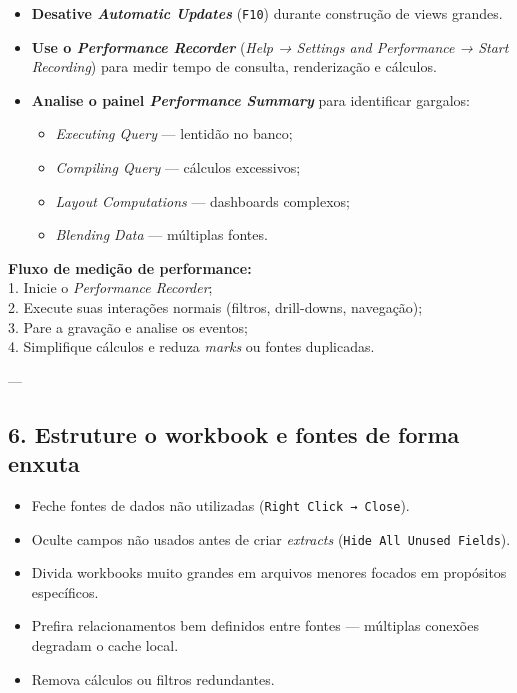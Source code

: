 \begin{itemize}[leftmargin=*]
  \item \textbf{Desative \textit{Automatic Updates}} (\texttt{F10}) durante construção de views grandes.  
  \item \textbf{Use o \textit{Performance Recorder}} (\textit{Help → Settings and Performance → Start Recording}) para medir tempo de consulta, renderização e cálculos.  
  \item \textbf{Analise o painel \textit{Performance Summary}} para identificar gargalos:  
    \begin{itemize}
      \item \textit{Executing Query} — lentidão no banco;  
      \item \textit{Compiling Query} — cálculos excessivos;  
      \item \textit{Layout Computations} — dashboards complexos;  
      \item \textit{Blending Data} — múltiplas fontes.  
    \end{itemize}
\end{itemize}

\begin{FormulaBox}
\textbf{Fluxo de medição de performance:}\\
1. Inicie o \textit{Performance Recorder};\\
2. Execute suas interações normais (filtros, drill-downs, navegação);\\
3. Pare a gravação e analise os eventos;\\
4. Simplifique cálculos e reduza \textit{marks} ou fontes duplicadas.
\end{FormulaBox}

---

\subsection{6. Estruture o workbook e fontes de forma enxuta}

\begin{itemize}[leftmargin=*]
  \item Feche fontes de dados não utilizadas (\texttt{Right Click → Close}).  
  \item Oculte campos não usados antes de criar \textit{extracts} (\texttt{Hide All Unused Fields}).  
  \item Divida workbooks muito grandes em arquivos menores focados em propósitos específicos.  
  \item Prefira relacionamentos bem definidos entre fontes — múltiplas conexões degradam o cache local.  
  \item Remova cálculos ou filtros redundantes.  
\end{itemize}

